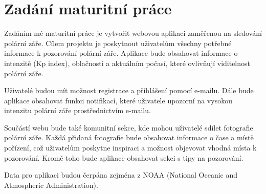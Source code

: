 \thispagestyle{empty}
\section*{\LARGE \textbf{Zadání maturitní práce}} 
\par Zadáním mé maturitní práce je vytvořit webovou aplikaci zaměřenou na sledování polární záře. Cílem projektu je poskytnout uživatelům všechny potřebné informace k pozorování polární záře. Aplikace bude obsahovat informace o intenzitě (Kp index), oblačnosti a aktuálním počasí, které ovlivňují viditelnost polární záře.

Uživatelé budou mít možnost registrace a přihlášení pomocí e-mailu. Dále bude aplikace obsahovat funkci notifikací, které uživatele upozorní na vysokou intenzitu polární záře prostřednictvím e-mailu.

Součástí webu bude také komunitní sekce, kde mohou uživatelé sdílet fotografie polární záře. Každá přidaná fotografie bude obsahovat informace o čase a místě pořízení, což uživatelům poskytne inspiraci a možnost objevovat vhodná místa k pozorování. Kromě toho bude aplikace obsahovat sekci s tipy na pozorování.

Data pro aplikaci budou čerpána zejména z NOAA (National Oceanic and Atmospheric Administration).